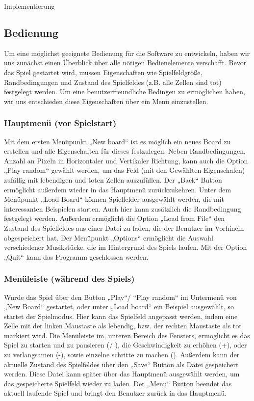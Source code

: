 \documentclass[runningheads]{llncs}
\begin{document}
\begin{section}{Implementierung}
      
    \newpage 
    \subsection{Bedienung}

    
    
Um eine möglichst geeignete Bedienung für die Software zu entwickeln, haben wir uns zunächst einen Überblick über alle nötigen Bedienelemente verschafft. Bevor das Spiel gestartet wird, müssen Eigenschaften wie Spielfeldgröße, Randbedingungen und Zustand des Spielfeldes (z.B. alle Zellen sind tot) festgelegt werden. Um eine benutzerfreundliche Bedingen zu ermöglichen haben, wir uns entschieden diese Eigenschaften über ein Menü einzustellen.
	\subsubsection{Hauptmenü (vor Spielstart)}
Mit dem ersten Menüpunkt „New board“ ist es möglich ein neues Board zu erstellen und alle Eigenschaften für dieses festzulegen. Neben Randbedingungen, Anzahl an Pixeln in Horizontaler und Vertikaler Richtung, kann auch die Option „Play random“ gewählt werden, um das Feld (mit den Gewählten Eigenschafen) zufällig mit lebendigen und toten Zellen auszufüllen. Der „Back“ Button ermöglicht außerdem wieder in das Hauptmenü zurückzukehren. \newline
Unter dem Menüpunkt „Load Board“ können Spielfelder ausgewählt werden, die mit interessanten Beispielen starten. Auch hier kann zusätzlich die Randbedingung festgelegt werden. Außerdem ermöglicht die Option „Load from File“ den Zustand des Spielfeldes aus einer Datei zu laden, die der Benutzer im Vorhinein abgespeichert hat. 
Der Menüpunkt „Options“ ermöglicht die Auswahl verschiedener Musikstücke, die im Hintergrund des Spiels laufen. Mit der Option „Quit“ kann das Programm geschlossen werden.
	\subsubsection{Menüleiste (während des Spiels)}
Wurde das Spiel über den Button „Play“/ “Play random“ im Untermenü von „New Board“ gestartet, oder unter „Load board“ ein Beispiel ausgewählt, so startet der Spielmodus. Hier kann das Spielfeld angepasst werden, indem eine Zelle mit der linken Maustaste als lebendig, bzw. der rechten Maustaste als tot markiert wird. \newline
Die Menüleiste im, unteren Bereich des Fensters, ermöglicht es das Spiel zu starten und zu pausieren (/ ), die Geschwindigkeit zu erhöhen (+), oder zu verlangsamen (-), sowie einzelne schritte zu machen (). Außerdem kann der aktuelle Zustand des Spielfeldes über den „Save“ Button als Datei gespeichert werden. Diese Datei kann später über das Hauptmenü ausgewählt werden, um das gespeicherte Spielfeld wieder zu laden. Der „Menu“ Button beendet das aktuell laufende Spiel und bringt den Benutzer zurück in das Hauptmenü. 

\end{section}
\end{document}
